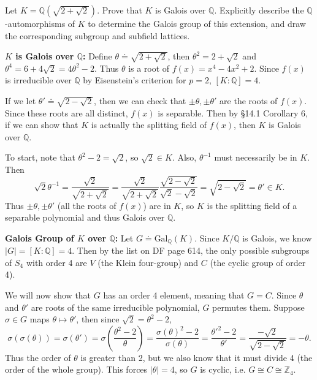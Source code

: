 \documentclass[twoside,10pt]{report}
\begin{document}

\begin{exer}[]
	Let $K=\mathbb{Q}(\sqrt{2+\sqrt{2} } )$. Prove that $K$ is Galois over $\mathbb{Q}$. Explicitly describe the $\mathbb{Q}$-automorphisms of $K$ to determine the Galois group of this extension, and draw the corresponding subgroup and subfield lattices.
\end{exer}
\textbf{$K$ is Galois over $\mathbb{Q}$:} Define $\theta \doteq \sqrt{2+\sqrt{2} } $, then $\theta^2=2+\sqrt{2} $ and $\theta^{4}=6+4\sqrt{2} =4\theta^2-2$. Thus $\theta$ is a root of $f(x) = x^{4}-4x^2+2$. Since $f(x)$ is irreducible over $\mathbb{Q}$ by Eisenstein's criterion for $p=2$, $[K:\mathbb{Q}]=4$.

If we let $\theta' \doteq \sqrt{2-\sqrt{2} } $, then we can check that $\pm \theta,\pm\theta'$ are the roots of $f(x)$. Since these roots are all distinct, $f(x)$ is separable. Then by \S 14.1 Corollary 6, if we can show that $K$ is actually the splitting field of $f(x)$, then $K$ is Galois over $\mathbb{Q}$.

To start, note that $\theta^{2}-2=\sqrt{2} $, so $\sqrt{2} \in K$. Also, $\theta^{-1}$ must necessarily be in $K$. Then
\[
	\sqrt{2} \theta^{-1} = \frac{\sqrt{2} }{\sqrt{2+\sqrt{2} } } = \frac{\sqrt{2} }{\sqrt{2+\sqrt{2} } } \frac{\sqrt{2-\sqrt{2} } }{\sqrt{2} -\sqrt{2} } = \sqrt{2-\sqrt{2} } =\theta'\in K.
\] 
Thus $\pm \theta,\pm\theta'$ (all the roots of $f(x)$) are in $K$, so $K$ is the splitting field of a separable polynomial and thus Galois over $\mathbb{Q}$.

\textbf{Galois Group of $K$ over $\mathbb{Q}$:} Let $G \doteq \text{Gal}_{\mathbb{Q}}(K)$. Since $K/\mathbb{Q}$ is Galois, we know $|G|=[K:\mathbb{Q}]=4$. Then by the list on DF page 614, the only possible subgroups of $S_4$ with order 4 are $V$ (the Klein four-group) and $C$ (the cyclic group of order 4).

We will now show that $G$ has an order 4 element, meaning that $G=C$. Since $\theta$ and $\theta'$ are roots of the same irreducible polynomial, $G$ permutes them. Suppose $\sigma\in G$ maps $\theta \mapsto \theta'$, then since $\sqrt{2} =\theta^{2}-2$,
\[
	\sigma(\sigma(\theta)) = \sigma(\theta') = \sigma\left( \frac{\theta^{2}-2 }{\theta }  \right) = \frac{\sigma(\theta)^{2}-2}{\sigma(\theta)} = \frac{\theta'^{2}-2}{\theta'} = \frac{-\sqrt{2} }{\sqrt{2-\sqrt{2} } } =-\theta.
\] 
Thus the order of $\theta$ is greater than 2, but we also know that it must divide 4 (the order of the whole group). This forces $|\theta|=4$, so $G$ is cyclic, i.e. $G \cong C \cong \mathbb{Z}_{4}$.
\end{document}
